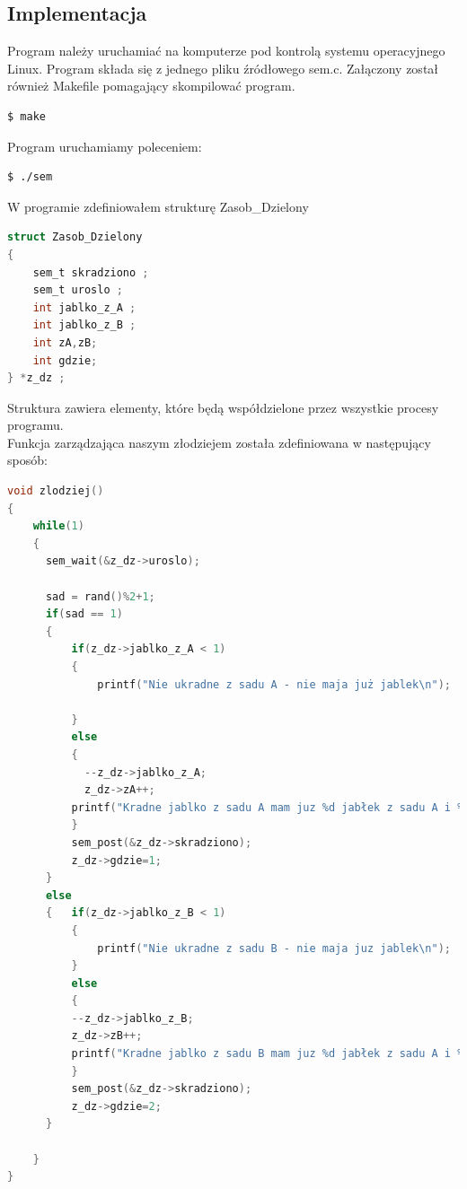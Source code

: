 \documentclass[10pt,a4paper]{article}
\begin{document}
\subsection{Implementacja}
Program należy uruchamiać na komputerze pod kontrolą systemu operacyjnego Linux. Program składa się z jednego pliku źródłowego sem.c. Załączony został również Makefile pomagający skompilować program.
\begin{lstlisting}[language=bash,caption=Skompilowanie programu poleceniem make]
  $ make
\end{lstlisting}
Program uruchamiamy poleceniem:
\begin{lstlisting}[language=bash,caption=Uruchomienie programu]
  $ ./sem
\end{lstlisting}
W programie zdefiniowałem strukturę \textcolor{Fuksjowy}{Zasob\_Dzielony}
\begin{lstlisting}[language=C,caption=struktura Zasob\_Dzielony]
struct Zasob_Dzielony
{
    sem_t skradziono ;
    sem_t uroslo ;
    int jablko_z_A ;
    int jablko_z_B ;
    int zA,zB;  
    int gdzie;
} *z_dz ;
\end{lstlisting}
Struktura zawiera elementy, które będą współdzielone przez wszystkie procesy programu.\\
Funkcja zarządzająca naszym złodziejem została zdefiniowana w następujący sposób:
\begin{lstlisting}[language=C,caption=Funkcja zarządzająca złodziejem,basicstyle=\footnotesize]
void zlodziej()
{   
    while(1)
    {
      sem_wait(&z_dz->uroslo);
      
      sad = rand()%2+1; 
      if(sad == 1)
      {
          if(z_dz->jablko_z_A < 1)
          {
              printf("Nie ukradne z sadu A - nie maja już jablek\n");
             
          } 
          else
          {
            --z_dz->jablko_z_A;
            z_dz->zA++;
          printf("Kradne jablko z sadu A mam juz %d jabłek z sadu A i %d jablek z sadu B \n ",z_dz->zA,z_dz->zB);
          }
          sem_post(&z_dz->skradziono);
          z_dz->gdzie=1;
      }
      else
      {   if(z_dz->jablko_z_B < 1)
          {
              printf("Nie ukradne z sadu B - nie maja juz jablek\n");
          }
          else
          {
          --z_dz->jablko_z_B;
          z_dz->zB++;
          printf("Kradne jablko z sadu B mam juz %d jabłek z sadu A i %d jablek z sadu B \n ",z_dz->zA,z_dz->zB);
          }
          sem_post(&z_dz->skradziono);
          z_dz->gdzie=2;
      }
         
    }
}
\end{lstlisting}
\end{document}
